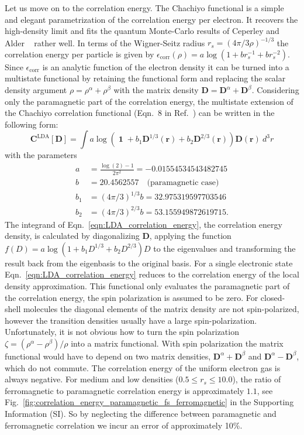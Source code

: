 \documentclass[journal=jpclcd,manuscript=letter]{achemso}
\DeclareMathOperator{\Id}{\mathbf{1}}
\newcommand\m[1]{\mathbf{#1}}
\renewcommand\vec[1]{\mathbf{#1}}
\begin{document}
Let us move on to the correlation energy.
The Chachiyo functional \cite{Chachiyo2016} is a simple and elegant parametrization of the correlation energy per electron.
It recovers the high-density limit and fits the quantum Monte-Carlo results of Ceperley and Alder ~\cite{Ceperley1980} rather well.
In terms of the Wigner-Seitz radius $r_s=\left(4 \pi /3 \rho\right)^{-1/3}$ the correlation energy per particle is given
by $\epsilon_{\text{corr}}(\rho) = a \log(1 + b r_s^{-1} + b r_s^{-2})$. Since $\epsilon_{\text{corr}}$ is an analytic function of the electron density
it can be turned into a multistate functional by retaining the
functional form and replacing the scalar density argument $\rho=\rho^{\alpha}+\rho^{\beta}$
with the matrix density $\m{D}=\m{D}^{\alpha}+\m{D}^{\beta}$. Considering only the paramagnetic part of the correlation energy,
the multistate extension of the Chachiyo correlation functional (Eqn.~8 in Ref.~\cite{Chachiyo2016}) can be written in the following form:
\begin{equation}
 \m{C}^{\text{LDA}}[\m{D}] = \int a \log\left( \Id + b_1 \m{D}^{1/3}(\vec{r}) + b_2 \m{D}^{2/3}(\vec{r}) \right) \m{D}(\vec{r}) ~ d^3r
 \label{eqn:LDA_correlation_energy}
\end{equation}
with the parameters
\begin{align}
 a &= \frac{\log(2)-1}{2 \pi^2} = -0.01554534543482745 \\
 b &= 20.4562557 \quad \text{(paramagnetic case)} \\
 b_1 &= \left(4 \pi /3 \right)^{1/3} b = 32.975319597703546 \\
 b_2 &= \left(4 \pi /3 \right)^{2/3} b = 53.155949872619715.
\end{align}
The integrand of Eqn.~\ref{eqn:LDA_correlation_energy}, the correlation energy density,
is calculated by diagonalizing $\m{D}$,
applying the function $f(D) = a \log(1 + b_1 D^{1/3} + b_2 D^{2/3}) D$ to the eigenvalues
and transforming the result back from the eigenbasis to the original basis.
For a single electronic state Eqn.~\ref{eqn:LDA_correlation_energy} reduces to the correlation energy
of the local density approximation.
This functional only evaluates the paramagnetic part of the correlation
energy, the spin polarization is assumed to be zero.
For closed-shell molecules the diagonal elements of the matrix density are not spin-polarized, however
the transition densities usually have a large spin-polarization. Unfortunately, it is not obvious how to turn the spin
polarization $\zeta = (\rho^{\alpha} - \rho^{\beta})/\rho$ into a matrix functional. With spin polarization the
matrix functional would have to depend on two matrix densities, $\m{D}^{\alpha}+\m{D}^{\beta}$ and $\m{D}^{\alpha}-\m{D}^{\beta}$,
which do not commute.
The correlation energy of the uniform electron gas is always negative. For medium
and low densities ($0.5 \leq r_s \leq 10.0$), the ratio of ferromagnetic to paramagnetic
correlation energy is approximately $1.1$, see Fig.~\ref{fig:correlation_energy_paramagnetic_fs_ferromagnetic} in the Supporting Information (SI).
So by neglecting the difference between paramagnetic and ferromagnetic correlation
we incur an error of approximately 10\%.
\end{document}
